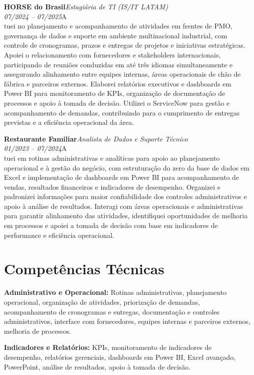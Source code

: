 \documentclass[11pt,a4paper]{article}
\newcommand{\cvrole}[4]{%
  \vspace{4pt}%
  {\bfseries\color{accentcolor}#1}\hfill{\itshape #2}\\[-2pt]%
  {\itshape #3}\hfill #4\\[6pt]%
}
\begin{document}
\cvrole{HORSE do Brasil}{Estagiária de TI (IS/IT LATAM)}{07/2024 -- 07/2025}

Atuei no planejamento e acompanhamento de atividades em frentes de PMO, governança de dados e suporte em ambiente multinacional industrial, com controle de cronogramas, prazos e entregas de projetos e iniciativas estratégicas. Apoiei o relacionamento com fornecedores e stakeholders internacionais, participando de reuniões conduzidas em até três idiomas simultaneamente e assegurando alinhamento entre equipes internas, áreas operacionais de chão de fábrica e parceiros externos. Elaborei relatórios executivos e dashboards em Power BI para monitoramento de KPIs, organização de documentação de processos e apoio à tomada de decisão. Utilizei o ServiceNow para gestão e acompanhamento de demandas, contribuindo para o cumprimento de entregas previstas e a eficiência operacional da área.

\cvrole{Restaurante Familiar}{Analista de Dados e Suporte Técnico}{01/2023 -- 07/2024}

Atuei em rotinas administrativas e analíticas para apoio ao planejamento operacional e à gestão do negócio, com estruturação do zero da base de dados em Excel e implementação de dashboards em Power BI para acompanhamento de vendas, resultados financeiros e indicadores de desempenho. Organizei e padronizei informações para maior confiabilidade dos controles administrativos e apoio à análise de resultados. Interagi com áreas operacionais e administrativas para garantir alinhamento das atividades, identifiquei oportunidades de melhoria em processos e apoiei a tomada de decisão com base em indicadores de performance e eficiência operacional.

\section{Competências Técnicas}

\textbf{Administrativo e Operacional:} Rotinas administrativas, planejamento operacional, organização de atividades, priorização de demandas, acompanhamento de cronogramas e entregas, documentação e controles administrativos, interface com fornecedores, equipes internas e parceiros externos, melhoria de processos.

\textbf{Indicadores e Relatórios:} KPIs, monitoramento de indicadores de desempenho, relatórios gerenciais, dashboards em Power BI, Excel avançado, PowerPoint, análise de resultados, apoio à tomada de decisão.
\end{document}
